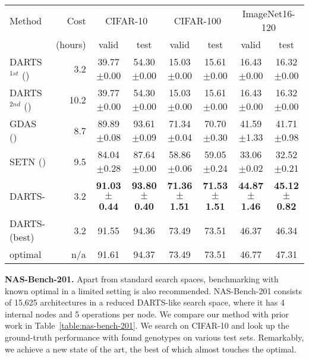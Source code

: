 \documentclass{article} \usepackage{iclr2021_conference,times}
\newcommand{\citeyp}[1]{(\citeyear{#1})}
\begin{document}
\begin{table*}[tb!]
	\setlength{\tabcolsep}{2pt}
	\begin{center}
		\caption{Searching performance on NAS-Bench-201 \citep{dong2020nasbench201}. Our method robustly obtains new SOTA. Averaged on 4 runs of searching. $^{1st}$: first-order, $^{2nd}$: second-order }
		\label{table:nas-bench-201}
		\small
		\begin{tabular}{lr*{6}{c}}
			\toprule
			Method	& Cost  & \multicolumn{2}{c}{CIFAR-10}  & \multicolumn{2}{c}{CIFAR-100}   & \multicolumn{2}{c}{ImageNet16-120}   \\
  & (hours) & valid & test & valid & test & valid & test \\
 \midrule
	DARTS$^{1st}$ \citeyp{liu2018darts} & 3.2 & 39.77$\pm$0.00 & 54.30$\pm$0.00 & 15.03$\pm$0.00 & 15.61$\pm$0.00 & 16.43$\pm$0.00 & 16.32$\pm$0.00 \\
	DARTS$^{2nd}$ \citeyp{liu2018darts} & 10.2 & 39.77$\pm$0.00 & 54.30$\pm$0.00 & 15.03$\pm$0.00 & 15.61$\pm$0.00 & 16.43$\pm$0.00 & 16.32$\pm$0.00 \\
	GDAS \citeyp{dong2019searching}  &  8.7 & 89.89$\pm$0.08 & 93.61$\pm$0.09 & 71.34$\pm$0.04 & 70.70$\pm$0.30 & 41.59$\pm$1.33 & 41.71$\pm$0.98 \\
	SETN \citeyp{dong2019one} & 9.5 & 84.04$\pm$0.28 & 87.64$\pm$0.00 & 58.86$\pm$0.06 & 59.05$\pm$0.24 & 33.06$\pm$0.02 & 32.52$\pm$0.21   \\ 
DARTS- & 3.2 & \textbf{91.03$\pm$0.44}	& \textbf{93.80$\pm$0.40} &	\textbf{71.36$\pm$1.51} &	\textbf{71.53$\pm$1.51}  	& \textbf{44.87$\pm$1.46}	& \textbf{45.12$\pm$0.82} \\ 
	DARTS- (best) & 3.2 & 91.55 &	94.36&73.49&	73.51&	46.37&	46.34 \\
	optimal & n/a & 91.61 & 94.37 & 73.49 & 73.51 & 46.77 & 47.31 \\
			\bottomrule
		\end{tabular}
	\end{center}
	\vskip -0.15in
\end{table*}

\textbf{NAS-Bench-201.}
Apart from standard search spaces, benchmarking with known optimal in a limited setting is also recommended. NAS-Bench-201 \citep{dong2020nasbench201} consists of 15,625 architectures in a reduced DARTS-like search space, where it has 4 internal nodes and 5 operations per node. We compare our method with prior work in Table~\ref{table:nas-bench-201}. We search on CIFAR-10 and look up the ground-truth performance with found genotypes on various test sets. Remarkably, we achieve a new state of the art, the best of which almost touches the optimal.
\end{document}
